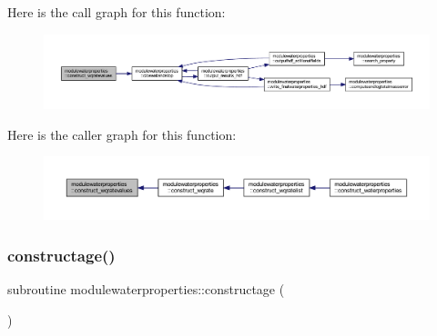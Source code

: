 Here is the call graph for this function\+:\nopagebreak
\begin{figure}[H]
\begin{center}
\leavevmode
\includegraphics[width=350pt]{namespacemodulewaterproperties_ad23f7574f0a024c14e1ef11aeadb52ab_cgraph}
\end{center}
\end{figure}
Here is the caller graph for this function\+:\nopagebreak
\begin{figure}[H]
\begin{center}
\leavevmode
\includegraphics[width=350pt]{namespacemodulewaterproperties_ad23f7574f0a024c14e1ef11aeadb52ab_icgraph}
\end{center}
\end{figure}
\mbox{\label{namespacemodulewaterproperties_ad670c20ce44d68b70fd32aa550c904db}} 
\subsubsection{\texorpdfstring{constructage()}{constructage()}}
{\footnotesize\ttfamily subroutine modulewaterproperties\+::constructage (\begin{DoxyParamCaption}{ }\end{DoxyParamCaption})\hspace{0.3cm}{\ttfamily [private]}}

